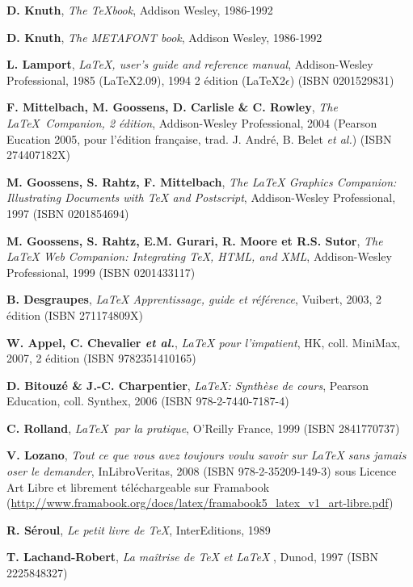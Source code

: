 \begin{thebibliography}{xx}
\textbf{D. Knuth}, \textsl{The \TeX book}, Addison Wesley, 1986-1992

\textbf{D. Knuth}, \textsl{The METAFONT book}, Addison Wesley, 1986-1992

\textbf{L. Lamport}, \textsl{\LaTeX, user's guide and
reference manual}, Addison-Wesley Professional, 1985 (\LaTeX 2.09), 1994 2\ieme{} édition (\LaTeX 2$\epsilon$) (ISBN 0201529831)

\textbf{F. Mittelbach, M. Goossens, D. Carlisle \& C. Rowley}, \textsl{The \LaTeX\ Companion, 2\ieme{} édition}, Addison-Wesley Professional, 2004 (Pearson Eucation 2005, pour l'édition française, trad. J. André, B. Belet \emph{et al.}) (ISBN 274407182X)

\textbf{M. Goossens, S. Rahtz, F. Mittelbach}, \textsl{ The {\LaTeX} Graphics Companion: Illustrating Documents with TeX and Postscript}, Addison-Wesley Professional, 1997 (ISBN 0201854694)

\textbf{M. Goossens, S. Rahtz, E.M. Gurari, R. Moore et R.S. Sutor}, \textsl{The {\LaTeX} Web Companion: Integrating TeX, HTML, and XML}, Addison-Wesley Professional, 1999 (ISBN 0201433117)

\textbf{B. Desgraupes}, \textsl{{\LaTeX} Apprentissage, guide et référence}, Vuibert, 2003, 2\ieme{} édition (ISBN 271174809X)

\textbf{W. Appel, C. Chevalier \emph{et al.}}, \textsl{{\LaTeX} pour l'impatient}, HK, coll. MiniMax, 2007, 2\ieme{} édition (ISBN 9782351410165)

\textbf{D. Bitouzé \& J.-C. Charpentier}, \textsl{\LaTeX: Synthèse de cours}, Pearson Education, coll. Synthex, 2006 (ISBN 978-2-7440-7187-4)

\textbf{C. Rolland}, \textsl{\LaTeX\ par la pratique}, O'Reilly France, 1999 (ISBN 2841770737)

\textbf{V. Lozano}, \textsl{Tout ce que vous avez toujours voulu savoir sur {\LaTeX} sans jamais oser le demander}, InLibroVeritas, 2008 (ISBN 978-2-35209-149-3) sous Licence Art Libre et librement téléchargeable sur Framabook (\url{http://www.framabook.org/docs/latex/framabook5_latex_v1_art-libre.pdf})

\textbf{R. Séroul}, \textsl{Le petit livre de \TeX}, InterEditions, 1989

\textbf{T. Lachand-Robert}, \textsl{La maîtrise de {\TeX} et {\LaTeX}} , Dunod, 1997 (ISBN 2225848327)


\end{thebibliography}
